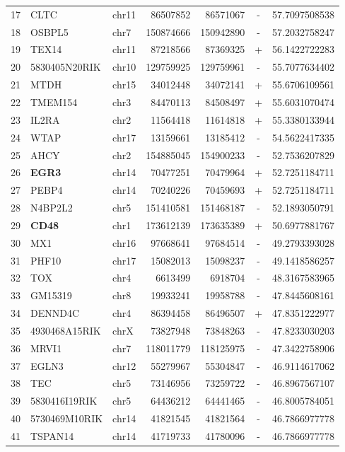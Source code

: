 \begin{table}
\begin{tabular}{rllrrcr}
17 & CLTC & chr11 & 86507852 & 86571067 & - & 57.7097508538 \\
18 & OSBPL5 & chr7 & 150874666 & 150942890 & - & 57.2032758247 \\
19 & TEX14 & chr11 & 87218566 & 87369325 & + & 56.1422722283 \\
20 & 5830405N20RIK & chr10 & 129759925 & 129759961 & - & 55.7077634402 \\
21 & MTDH & chr15 & 34012448 & 34072141 & + & 55.6706109561 \\
22 & TMEM154 & chr3 & 84470113 & 84508497 & + & 55.6031070474 \\
23 & IL2RA & chr2 & 11564418 & 11614818 & + & 55.3380133944 \\
24 & WTAP & chr17 & 13159661 & 13185412 & - & 54.5622417335 \\
25 & AHCY & chr2 & 154885045 & 154900233 & - & 52.7536207829 \\
26 & \textbf{EGR3} & chr14 & 70477251 & 70479964 & + & 52.7251184711 \\
27 & PEBP4 & chr14 & 70240226 & 70459693 & + & 52.7251184711 \\
28 & N4BP2L2 & chr5 & 151410581 & 151468187 & - & 52.1893050791 \\
29 & \textbf{CD48} & chr1 & 173612139 & 173635389 & + & 50.6977881767 \\
30 & MX1 & chr16 & 97668641 & 97684514 & - & 49.2793393028 \\
31 & PHF10 & chr17 & 15082013 & 15098237 & - & 49.1418586257 \\
32 & TOX & chr4 & 6613499 & 6918704 & - & 48.3167583965 \\
33 & GM15319 & chr8 & 19933241 & 19958788 & - & 47.8445608161 \\
34 & DENND4C & chr4 & 86394458 & 86496507 & + & 47.8351222977 \\
35 & 4930468A15RIK & chrX & 73827948 & 73848263 & - & 47.8233030203 \\
36 & MRVI1 & chr7 & 118011779 & 118125975 & - & 47.3422758906 \\
37 & EGLN3 & chr12 & 55279967 & 55304847 & - & 46.9114617062 \\
38 & TEC & chr5 & 73146956 & 73259722 & - & 46.8967567107 \\
39 & 5830416I19RIK & chr5 & 64436212 & 64441465 & - & 46.8005784051 \\
40 & 5730469M10RIK & chr14 & 41821545 & 41821564 & - & 46.7866977778 \\
41 & TSPAN14 & chr14 & 41719733 & 41780096 & - & 46.7866977778 \\

\end{tabular}
\end{table}
